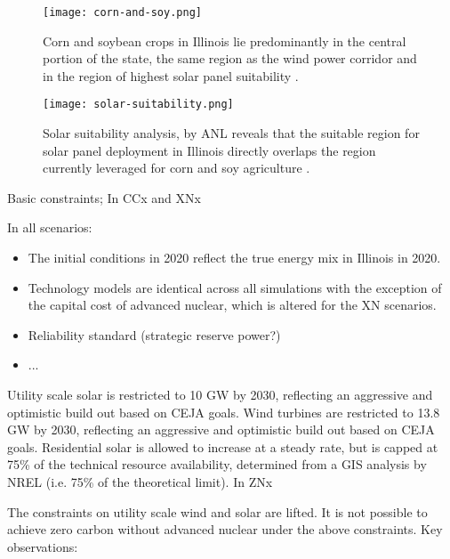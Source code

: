 \begin{figure}[htbp!]
        \begin{center}
                \texttt{[image: corn-and-soy.png]}
        \end{center}
        \caption{Corn and soybean crops in Illinois lie predominantly in the central 
        portion of the state, the same region as the wind power corridor and in the 
        region of highest solar panel suitability 
        \cite{schleusener_illinois_2020}.}
        \label{fig:corn-and-soy}
\end{figure}


\begin{figure}[htbp!]
        \begin{center}
                \texttt{[image: solar-suitability.png]}
        \end{center}
        \caption{Solar suitability analysis, by \gls{ANL} reveals that the
        suitable region for solar panel deployment in Illinois directly 
        overlaps the region currently leveraged for corn and soy agriculture 
        \cite{eispc_energy_2021}.}
        \label{fig:solar-suitability}
\end{figure}

Basic constraints;
In CCx and XNx

In all scenarios:
\begin{itemize}
        \item The initial conditions in 2020 reflect the true energy mix in 
                Illinois in 2020.
        \item Technology models are identical across all simulations with the exception of the capital cost of advanced nuclear, which is altered for the XN scenarios.
        \item Reliability standard (strategic reserve power?)
	\item ...
\end{itemize}

Utility scale solar is restricted to 10 GW by 2030, reflecting an aggressive and optimistic build out based on CEJA goals.
Wind turbines are restricted to 13.8 GW by 2030, reflecting an aggressive and optimistic build out based on CEJA goals.
Residential solar is allowed to increase at a steady rate, but is capped at 
75\% of the technical resource availability, determined from a GIS analysis by 
NREL (i.e. 75\% of the theoretical limit).
In ZNx

The constraints on utility scale wind and solar are lifted. It is not possible to achieve zero carbon without advanced nuclear under the above constraints.
Key observations:

